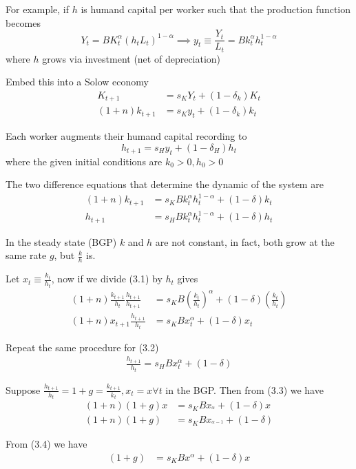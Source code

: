 \documentclass[twocolumn, fleqn]{article}
\begin{document}
		For example, if $h$ is humand capital per worker such that the production function becomes
		\[Y_t = BK_t^\alpha (h_t L_t)^{1-\alpha}\implies y_t \equiv \frac{Y_t}{L_t}=Bk_t^\alpha h_t^{1-\alpha} \]
		where $h$ grows via investment (net of depreciation)

		Embed this into a Solow economy
		\begin{align*}
			K_{t+1} &= s_K Y_t + (1-\delta_{k})K_t\\
			(1+n)k_{t+1} &= s_K y_t + (1-\delta_k)k_t
		\end{align*}

		Each worker augments their humand capital recording to
		\[h_{t+1} = s_H y_t + (1-\delta_H)h_t\]
		where the given initial conditions are $k_0>0, h_0>0$

		The two difference equations that determine the dynamic of the system are
		\begin{align*}
		(1+n)k_{t+1} &= s_K B k_t^{\alpha}h_t^{1-\alpha}+(1-\delta)k_t \tag{3.1}\\
			h_{t+1} &= s_H B k_t^{\alpha} h_t^{1-\alpha}+(1-\delta)h_t \tag{3.2}
		\end{align*}

		In the steady state (BGP) $k$ and $h$ are not constant, in fact, both grow at the same rate $g$, but $
		\frac{k}{h}$ is.

		Let $x_t \equiv \frac{k_t}{h_t}$, now if we divide (3.1) by $h_t$ gives
		\begin{align*}
		(1+n)\frac{k_{t+1}}{h_t} \frac{h_{t+1}}{h_{t+1}} &= s_K B \left(\frac{k_t}{h_t}\right)^{\alpha} + (1-\delta)\left( \frac{k_t}{h_t} \right)\\
		(1+n) x_{t+1} \frac{h_{t+1}}{h_t} &= s_K B x_{t}^{\alpha} + (1-\delta)x_t \tag{3.3}
		\end{align*}

		Repeat the same procedure for (3.2)
		\begin{align*}
			\frac{h_{t+1}}{h_t} = s_H Bx_t^{\alpha} +(1-\delta) \tag{3.4}
		\end{align*}

		Suppose $\frac{h_{t+1}}{h_t}=1+g = \frac{k_{t+1}}{k_t}, x_t = x \forall t$ in the BGP.
		Then from (3.3) we have
		\begin{align*}
		(1+n)(1+g)x &= s_K B x_^{\alpha} + (1-\delta)x\\
		(1+n)(1+g) &= s_K B x_^{\alpha-1} + (1-\delta) \tag{3.3a}
		\end{align*}

		From (3.4) we have
		\begin{align*}
		(1+g) &= s_K B x^{\alpha} + (1-\delta)x \tag{3.4a}
		\end{align*}
\end{document}

